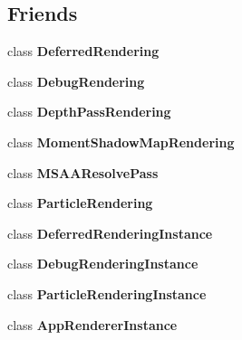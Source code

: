 \subsection*{Friends}
\begin{DoxyCompactItemize}
\item 
\mbox{\label{classAppRenderer_a355bf32616f2e1751ee46bd315e905e5}} 
class {\bfseries Deferred\+Rendering}
\item 
\mbox{\label{classAppRenderer_a6611940d699c1a465f439495d9ad98d3}} 
class {\bfseries Debug\+Rendering}
\item 
\mbox{\label{classAppRenderer_ad456619a35eac3a6efbe8557a0ccc425}} 
class {\bfseries Depth\+Pass\+Rendering}
\item 
\mbox{\label{classAppRenderer_a23797ad96fd0436c2365d4c86df7adde}} 
class {\bfseries Moment\+Shadow\+Map\+Rendering}
\item 
\mbox{\label{classAppRenderer_ac54ffcb054b1f5a95256118dbdeae9f2}} 
class {\bfseries M\+S\+A\+A\+Resolve\+Pass}
\item 
\mbox{\label{classAppRenderer_a0cb4dedb676c1c060cf82ddb22f668bf}} 
class {\bfseries Particle\+Rendering}
\item 
\mbox{\label{classAppRenderer_a7bec99218ac38952a4baa8888bc7fedc}} 
class {\bfseries Deferred\+Rendering\+Instance}
\item 
\mbox{\label{classAppRenderer_aa2fce3a4ae64b69f01e0fd64ba26023a}} 
class {\bfseries Debug\+Rendering\+Instance}
\item 
\mbox{\label{classAppRenderer_aba9f3240241811e775ef4280a9df4333}} 
class {\bfseries Particle\+Rendering\+Instance}
\item 
\mbox{\label{classAppRenderer_a0afda4cbff6d9e5529eca6ee18a2a129}} 
class {\bfseries App\+Renderer\+Instance}
\item 
\mbox{\label{classAppRenderer_a1b9897dd2ae9e6c35d99de6c02d2b693}} 

\end{DoxyCompactItemize}
